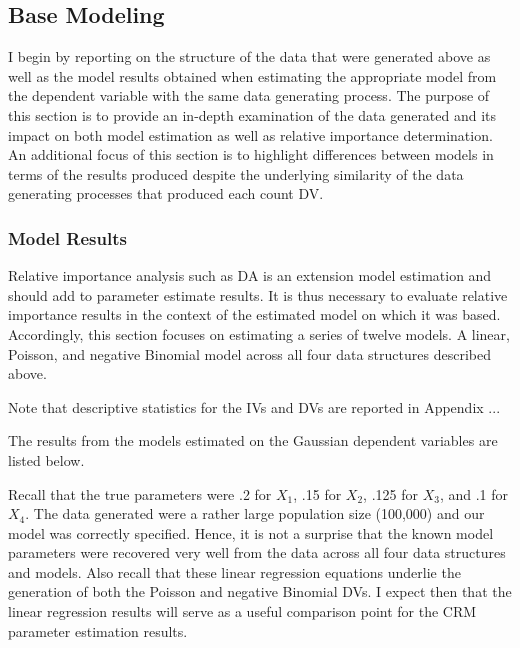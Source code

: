 \documentclass[ShortAfour,times,sageapa]{sagej}
\begin{document}
	\subsection{Base Modeling}
	
	I begin by reporting on the structure of the data that were generated above as well as the model results obtained when estimating the appropriate model from the dependent variable with the same data generating process.
	The purpose of this section is to provide an in-depth examination of the data generated and its impact on both model estimation as well as relative importance determination.  An additional focus of this section is to highlight differences between models in terms of the results produced despite the underlying similarity of the data generating processes that produced each count DV.
	
		\subsubsection{Model Results}
	
	Relative importance analysis such as DA is an extension model estimation and should add to parameter estimate results.  
	It is thus necessary to evaluate relative importance results in the context of the estimated model on which it was based.
	Accordingly, this section focuses on estimating a series of twelve models.  A linear, Poisson, and negative Binomial model across all four data structures described above.
	
	Note that descriptive statistics for the IVs and DVs are reported in Appendix ...
	
	The results from the models estimated on the Gaussian dependent variables are listed below.
	
	
	
	Recall that the true parameters were .2 for $X_1$, .15 for $X_2$, .125 for $X_3$, and .1 for $X_4$.  The data generated were a rather large population size (100,000) and our model was correctly specified.  Hence, it is not a surprise that the known model parameters were recovered very well from the data across all four data structures and models.
	Also recall that these linear regression equations underlie the generation of both the Poisson and negative Binomial DVs.  
	I expect then that the linear regression results will serve as a useful comparison point for the CRM parameter estimation results.
	
	
	
\end{document}
